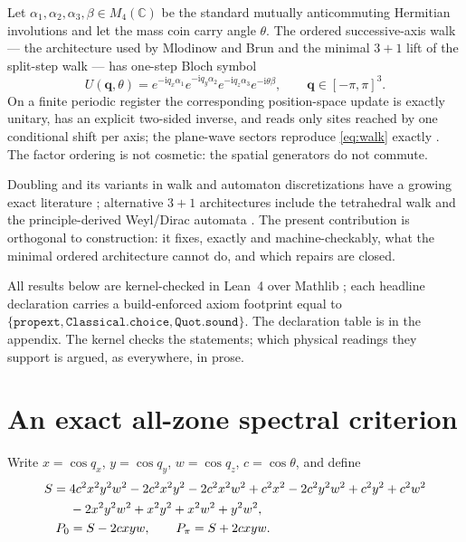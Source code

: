 \documentclass[11pt]{article}
\newcommand{\ii}{\mathrm{i}}
\newcommand{\C}{\mathbb{C}}
\begin{document}
Let $\alpha_1,\alpha_2,\alpha_3,\beta\in M_4(\C)$ be the standard mutually
anticommuting Hermitian involutions and let the mass coin carry angle
$\theta$.  The ordered successive-axis walk --- the architecture used by
Mlodinow and Brun \cite{MlodinowBrun} and the minimal $3+1$ lift of the
split-step walk --- has one-step Bloch symbol
\begin{equation}\label{eq:walk}
 U(\mathbf q,\theta)
 =e^{-\ii q_x\alpha_1}e^{-\ii q_y\alpha_2}e^{-\ii q_z\alpha_3}
  e^{-\ii\theta\beta},
 \qquad \mathbf q\in[-\pi,\pi]^3 .
\end{equation}
On a finite periodic register the corresponding position-space update is
exactly unitary, has an explicit two-sided inverse, and reads only sites
reached by one conditional shift per axis; the plane-wave sectors reproduce
\eqref{eq:walk} exactly \cite{CompanionDerivation}.  The factor ordering is
not cosmetic: the spatial generators do not commute.

Doubling and its variants in walk and automaton discretizations have a
growing exact literature \cite{MlodinowBrunNoGo,GuptaShortQCA}; alternative
$3+1$ architectures include the tetrahedral walk \cite{NzonganiTetra} and
the principle-derived Weyl/Dirac automata \cite{DArianoPerinotti,FreeQCA}.  The present
contribution is orthogonal to construction: it fixes, exactly and
machine-checkably, what the minimal ordered architecture cannot do, and
which repairs are closed.

All results below are kernel-checked in Lean~4 over Mathlib
\cite{Lean4,Mathlib}; each headline declaration carries a build-enforced
axiom footprint equal to
$\{\mathtt{propext},\mathtt{Classical.choice},\mathtt{Quot.sound}\}$.  The
declaration table is in the appendix.  The kernel checks the statements;
which physical readings they support is argued, as everywhere, in prose.

\section{An exact all-zone spectral criterion}
\label{sec:criterion}

Write $x=\cos q_x$, $y=\cos q_y$, $w=\cos q_z$, $c=\cos\theta$, and define
\begin{align}
 S={}&4c^2x^2y^2w^2-2c^2x^2y^2-2c^2x^2w^2+c^2x^2
      -2c^2y^2w^2+c^2y^2+c^2w^2 \notag\\
   &{}-2x^2y^2w^2+x^2y^2+x^2w^2+y^2w^2,
 \label{eq:S}\\
 P_0&=S-2cxyw,
 \qquad
 P_\pi=S+2cxyw.
 \label{eq:P}
\end{align}
\end{document}
